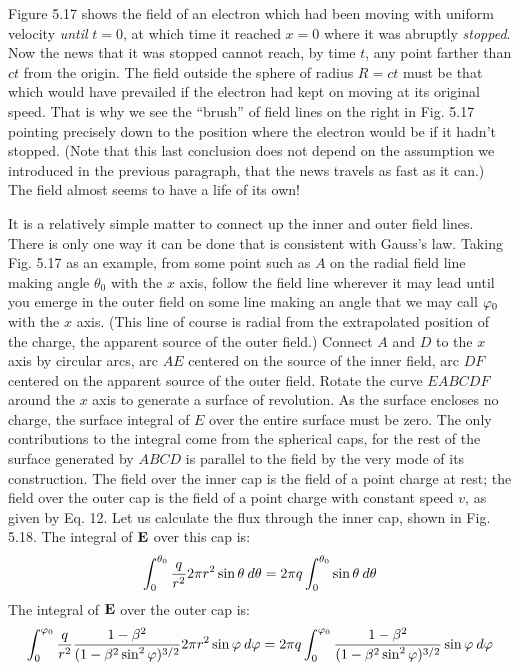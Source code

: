 Figure 5.17 shows the field of an electron which had been moving
with uniform velocity \emph{until} $t = 0$, at which time it reached $x = 0$
where it was abruptly \emph{stopped}. Now the news that it was stopped
cannot reach, by time $t$, any point farther than $ct$ from the origin.
The field outside the sphere of radius $R = ct$ must be that which
would have prevailed if the electron had kept on moving at its original
speed. That is why we see the ``brush'' of field lines on the right
in Fig. 5.17 pointing precisely down to the position where the electron
would be if it hadn't stopped. (Note that this last conclusion
does not depend on the assumption we introduced in the previous
paragraph, that the news travels as fast as it can.) The field almost
seems to have a life of its own!

It is a relatively simple matter to connect up the inner and outer
field lines. There is only one way it can be done that is consistent
with Gauss's law. Taking Fig. 5.17 as an example, from some point
such as $A$ on the radial field line making angle $\theta_0$ with the $x$ axis,
follow the field line wherever it may lead until you emerge in the
outer field on some line making an angle that we may call $\varphi_0$ with
the $x$ axis. (This line of course is radial from the extrapolated position
of the charge, the apparent source of the outer field.) Connect
$A$ and $D$ to the $x$ axis by circular arcs, arc $AE$ centered on the source
of the inner field, arc $DF$ centered on the apparent source of the
outer field. Rotate the curve $EABCDF$ around the $x$ axis to generate
a surface of revolution. As the surface encloses no charge, the surface
integral of $E$ over the entire surface must be zero. The only
contributions to the integral come from the spherical caps, for the
rest of the surface generated by $ABCD$ is parallel to the field by the
very mode of its construction. The field over the inner cap is the
field of a point charge at rest; the field over the outer cap is the field
of a point charge with constant speed $v$, as given by Eq. 12. Let us
calculate the flux through the inner cap, shown in Fig. 5.18. The
integral of $\mathbf{E}$ over this cap is:
\begin{equation}
  \int_0^{\theta_0} \frac{q}{r^2} 2\pi r^2\sin\theta\:d\theta
              = 2\pi q \int_0^{\theta_0} \sin\theta\:d\theta
\end{equation}
The integral of $\mathbf{E}$ over the outer cap is:
\begin{equation}
  \int_0^{\varphi_0} \frac{q}{r^2} \frac{1-\beta^2}{(1-\beta^2\sin^2\varphi)^{3/2}} 2\pi r^2\sin\varphi\:d\varphi
       = 2\pi q \int_0^{\varphi_0} \frac{1-\beta^2}{(1-\beta^2\sin^2\varphi)^{3/2}} \sin\varphi\:d\varphi
\end{equation}
